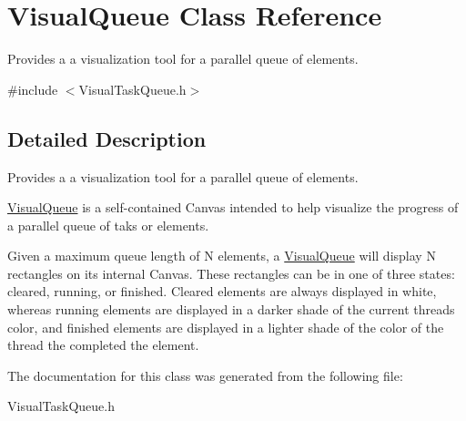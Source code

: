 \hypertarget{class_visual_queue}{}\section{Visual\+Queue Class Reference}
\label{class_visual_queue}


Provides a a visualization tool for a parallel queue of elements.  




{\ttfamily \#include $<$Visual\+Task\+Queue.\+h$>$}



\subsection{Detailed Description}
Provides a a visualization tool for a parallel queue of elements. 

\hyperlink{class_visual_queue}{Visual\+Queue} is a self-\/contained Canvas intended to help visualize the progress of a parallel queue of taks or elements.

Given a maximum queue length of {\ttfamily N} elements, a \hyperlink{class_visual_queue}{Visual\+Queue} will display {\ttfamily N} rectangles on its internal Canvas. These rectangles can be in one of three states\+: cleared, running, or finished. Cleared elements are always displayed in white, whereas running elements are displayed in a darker shade of the current thread\textquotesingle{}s color, and finished elements are displayed in a lighter shade of the color of the thread the completed the element. 

The documentation for this class was generated from the following file\+:\begin{DoxyCompactItemize}
\item 
Visual\+Task\+Queue.\+h\end{DoxyCompactItemize}
